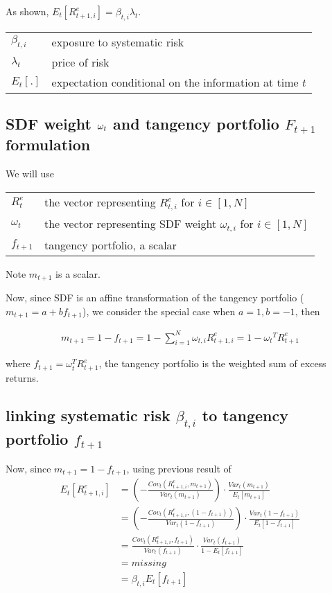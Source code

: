 \documentclass[11pt, oneside]{article}   	%
\begin{document}
As shown, $E_t\left[ R^e_{t+1, i}  \right] = \beta_{t, i}\lambda_t$.

\begin{tabular}{l @{ := } l}
    $\beta_{t,i}$ & exposure to systematic risk \\
    $\lambda_t$ & price of risk \\
    $E_t[.]$  & expectation conditional on the information at time $t$
\end{tabular}

\subsection{SDF weight $\boldmath{\omega_t}$ and tangency portfolio $F_{t+1}$ formulation}

We will use

\begin{tabular}{l @{ := } l}
    $R^e_t$ & the vector representing $R^e_{t, i}$ for $i\in[1, N]$\\
    $\omega_t$ & the vector representing SDF weight $\omega_{t, i}$ for $i\in[1, N]$ \\
    $f_{t+1}$ & tangency portfolio, a scalar
\end{tabular}

Note $m_{t+1}$ is a scalar.

Now, since SDF is an affine transformation of the tangency portfolio ($m_{t+1} = a + b{f_{t+1}}$), we consider the
special case when $a=1, b=-1$, then

\begin{align*}
    m_{t+1} = 1 - f_{t+1} = 1 - \sum_{i=1}^N \omega_{t, i} R^e_{t+1, i} = 1 - {\omega_t}^T {R^e_{t+1}}
\end{align*}

where $f_{t+1} = \omega_t^TR^e_{t+1}$, the tangency portfolio is the weighted sum of excess returns.

\subsection{linking systematic risk $\beta_{t,i}$ to tangency portfolio $f_{t+1}$}

Now, since $m_{t+1} = 1 - f_{t+1}$, using previous result of 
\begin{align*}
    E_t[R^e_{t+1, i}] &= \left( - \frac{Cov_t(R^e_{t+1, i}, m_{t+1})}{Var_t(m_{t+1})}  \right) \cdot
    \frac{Var_t(m_{t+1})}{E_t[m_{t+1}]} \\
                      &= \left( - \frac{Cov_t(R^e_{t+1, i},(1-f_{t+1}))}{Var_t(1-f_{t+1})} \right) \cdot 
                      \frac{Var_t(1-f_{t+1})}{E_t[1-f_{t+1}]} \\
                      &= \frac{Cov_t(R^e_{t+1, i}, f_{t+1})}{Var_t(f_{t+1})} \cdot \frac{Var_t(f_{t+1})}{1 -
                      E_t[f_{t+1}]} \\
                      &= missing \\
                      &= \beta_{t, i} E_t[f_{t+1}]
\end{align*}
\end{document}
